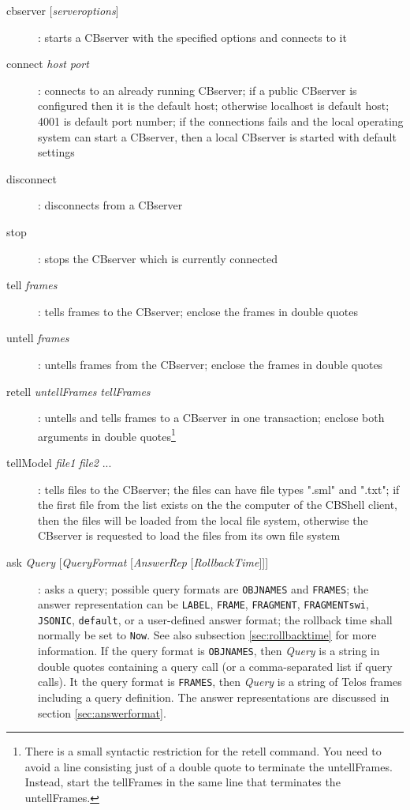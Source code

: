 \begin{description}


\item[{cbserver [{\it serveroptions}]}] :
      starts a CBserver with the specified options and connects to it

\item[connect {\it host} {\it port}] :
      connects to an already running CBserver;
      if a public CBserver is configured then it is the default host; otherwise localhost is default host;
      4001 is default port number; if the connections fails and the local operating system can start
      a CBserver, then a local CBserver is started with default settings

\item[disconnect] :
      disconnects from a CBserver

\item[stop] :
      stops the CBserver which is currently connected

\item[tell {\it frames}] :
      tells frames to the CBserver; enclose the frames in double quotes

\item[untell {\it frames}] :
      untells frames from the CBserver; enclose the frames in double quotes

\item[retell {\it untellFrames} {\it tellFrames}] :
      untells and tells frames to a CBserver in one transaction; enclose both arguments in
      double quotes\footnote{There is a small syntactic restriction for the retell
      command. You need to avoid a line consisting just of a double quote to terminate the untellFrames.
      Instead, start the tellFrames in the same line that terminates the untellFrames.}

\item[tellModel {\it file1} {\it file2} ...] :
      tells files to the CBserver; the files can have file types ".sml" and ".txt";
      if the first file from the list exists on the the computer of the CBShell client, then 
      the files will be loaded from the local file system, 
      otherwise the CBserver is requested to load the files from its
      own file system

\item[ask {\it Query} {[{\it QueryFormat} [{\it AnswerRep} [{\it RollbackTime}]]]}] :
      asks a query; possible query formats are {\tt OBJNAMES} and {\tt FRAMES};
      the answer representation can
      be {\tt LABEL}, {\tt FRAME}, {\tt FRAGMENT}, {\tt FRAGMENTswi}, {\tt JSONIC}, {\tt default}, or a user-defined answer format; the rollback
      time shall normally be set to {\tt Now}. See also subsection \ref{sec:rollbacktime} for more information.
      If the query format is {\tt OBJNAMES}, then {\it Query} is a string
      in double quotes containing a
      query call (or a comma-separated list if query calls). It the query format is {\tt FRAMES},
      then {\it Query} is a string of Telos frames including a query definition.
      The answer representations are discussed in section \ref{sec:answerformat}.


\end{description}
